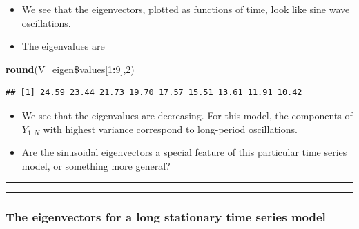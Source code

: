 \documentclass[]{article}
\newenvironment{Shaded}{\begin{snugshade}}{\end{snugshade}}
\newcommand{\KeywordTok}[1]{\textcolor[rgb]{0.13,0.29,0.53}{\textbf{#1}}}
\newcommand{\DecValTok}[1]{\textcolor[rgb]{0.00,0.00,0.81}{#1}}
\newcommand{\OperatorTok}[1]{\textcolor[rgb]{0.81,0.36,0.00}{\textbf{#1}}}
\newcommand{\NormalTok}[1]{#1}
\begin{document}
\begin{itemize}
\item
  We see that the eigenvectors, plotted as functions of time, look like
  sine wave oscillations.
\item
  The eigenvalues are
\end{itemize}

\begin{Shaded}
\begin{Highlighting}[]
\KeywordTok{round}\NormalTok{(V_eigen}\OperatorTok{\$}\NormalTok{values[}\DecValTok{1}\OperatorTok{:}\DecValTok{9}\NormalTok{],}\DecValTok{2}\NormalTok{)}
\end{Highlighting}
\end{Shaded}

\begin{verbatim}
## [1] 24.59 23.44 21.73 19.70 17.57 15.51 13.61 11.91 10.42
\end{verbatim}

\begin{itemize}
\item
  We see that the eigenvalues are decreasing. For this model, the
  components of \(Y_{1:N}\) with highest variance correspond to
  long-period oscillations.
\item
  Are the sinusoidal eigenvectors a special feature of this particular
  time series model, or something more general?
\end{itemize}

\begin{center}\rule{0.5\linewidth}{\linethickness}\end{center}

\begin{center}\rule{0.5\linewidth}{\linethickness}\end{center}

\subsubsection{The eigenvectors for a long stationary time series
model}\label{the-eigenvectors-for-a-long-stationary-time-series-model}
\end{document}
